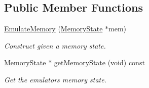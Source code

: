 \subsection*{Public Member Functions}
\begin{DoxyCompactItemize}
\item 
\mbox{\hyperlink{class_emulate_memory_a9d930600f03d692217331ff1f39f4650}{Emulate\+Memory}} (\mbox{\hyperlink{class_memory_state}{Memory\+State}} $\ast$mem)
\begin{DoxyCompactList}\small\item\em Construct given a memory state. \end{DoxyCompactList}\item 
\mbox{\hyperlink{class_memory_state}{Memory\+State}} $\ast$ \mbox{\hyperlink{class_emulate_memory_a1c5da535487d454ce9e09228bf52d8be}{get\+Memory\+State}} (void) const
\begin{DoxyCompactList}\small\item\em Get the emulator\textquotesingle{}s memory state. \end{DoxyCompactList}\end{DoxyCompactItemize}
